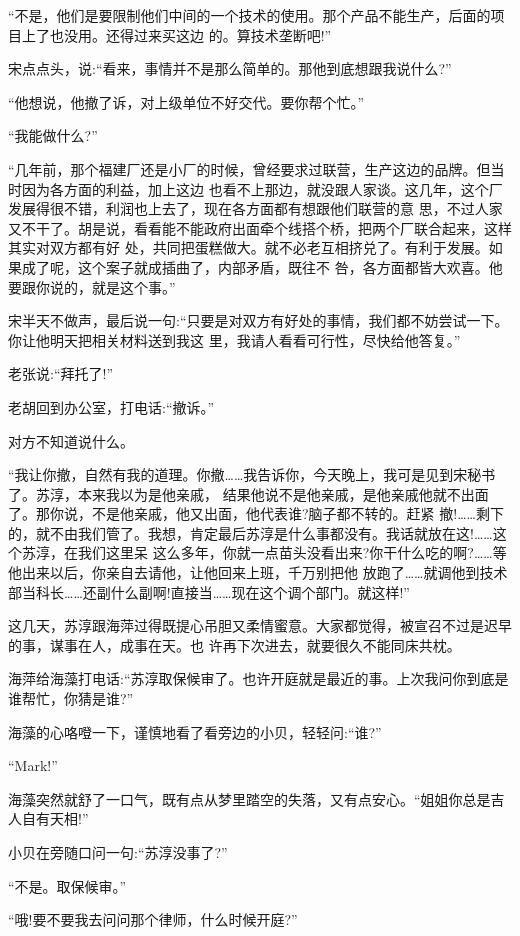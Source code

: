 \documentclass[11pt,a4paper,onecolumn]{article}
\begin{document}
``不是，他们是要限制他们中间的一个技术的使用。那个产品不能生产，后面的项目上了也没用。还得过来买这边
的。算技术垄断吧!''

宋点点头，说:``看来，事情并不是那么简单的。那他到底想跟我说什么?''

``他想说，他撤了诉，对上级单位不好交代。要你帮个忙。''

``我能做什么?''

``几年前，那个福建厂还是小厂的时候，曾经要求过联营，生产这边的品牌。但当时因为各方面的利益，加上这边
也看不上那边，就没跟人家谈。这几年，这个厂发展得很不错，利润也上去了，现在各方面都有想跟他们联营的意
思，不过人家又不干了。胡是说，看看能不能政府出面牵个线搭个桥，把两个厂联合起来，这样其实对双方都有好
处，共同把蛋糕做大。就不必老互相挤兑了。有利于发展。如果成了呢，这个案子就成插曲了，内部矛盾，既往不
咎，各方面都皆大欢喜。他要跟你说的，就是这个事。''

宋半天不做声，最后说一句:``只要是对双方有好处的事情，我们都不妨尝试一下。你让他明天把相关材料送到我这
里，我请人看看可行性，尽快给他答复。''

老张说:``拜托了!''

老胡回到办公室，打电话:``撤诉。''

对方不知道说什么。

``我让你撤，自然有我的道理。你撤……我告诉你，今天晚上，我可是见到宋秘书了。苏淳，本来我以为是他亲戚，
结果他说不是他亲戚，是他亲戚他就不出面了。那你说，不是他亲戚，他又出面，他代表谁?脑子都不转的。赶紧
撤!……剩下的，就不由我们管了。我想，肯定最后苏淳是什么事都没有。我话就放在这!……这个苏淳，在我们这里呆
这么多年，你就一点苗头没看出来?你干什么吃的啊?……等他出来以后，你亲自去请他，让他回来上班，千万别把他
放跑了……就调他到技术部当科长……还副什么副啊!直接当……现在这个调个部门。就这样!''

这几天，苏淳跟海萍过得既提心吊胆又柔情蜜意。大家都觉得，被宣召不过是迟早的事，谋事在人，成事在天。也
许再下次进去，就要很久不能同床共枕。

海萍给海藻打电话:``苏淳取保候审了。也许开庭就是最近的事。上次我问你到底是谁帮忙，你猜是谁?''

海藻的心咯噔一下，谨慎地看了看旁边的小贝，轻轻问:``谁?''

``Mark!''

海藻突然就舒了一口气，既有点从梦里踏空的失落，又有点安心。``姐姐你总是吉人自有天相!''

小贝在旁随口问一句:``苏淳没事了?''

``不是。取保候审。''

``哦!要不要我去问问那个律师，什么时候开庭?''
\end{document}
